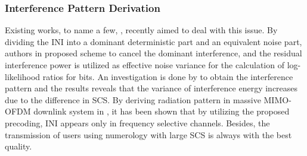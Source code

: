 \documentclass[journal,draftclsnofoot,onecolumn,12pt]{IEEEtran}
\theoremstyle{definition}
\begin{document}
\subsubsection{Interference Pattern Derivation}
 Existing works, to name a few, \cite{numerology_INI, numerology_INI2, numerology_INI_MIMO}, recently aimed to deal with this issue. By dividing the INI into a dominant deterministic part and an equivalent noise part, authors in \cite{numerology_INI} proposed scheme to cancel the dominant interference, and the residual interference power is utilized as effective noise variance for the calculation of log-likelihood ratios for bits. An investigation is done by \cite{numerology_INI2} to obtain the interference pattern and the results reveals that the variance of interference energy increases due to the difference in SCS. By deriving radiation pattern in massive MIMO-OFDM downlink system in \cite{numerology_INI_MIMO}, it has been shown that by utilizing the proposed precoding, INI appears only in frequency selective channels. Besides, the transmission of users using numerology with large SCS is always with the best quality. 







\end{document}
